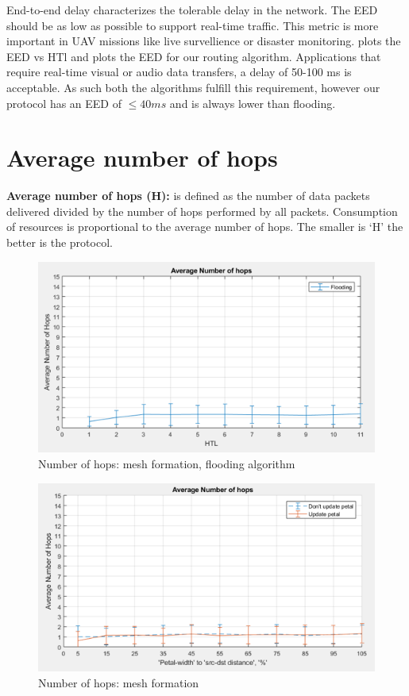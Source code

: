 End-to-end delay characterizes the tolerable delay in the network. The EED should be as low as possible to support real-time traffic. This metric is more important in UAV missions like live survellience or disaster monitoring.  plots the EED vs HTl and  plots the EED for our routing algorithm. Applications that require real-time visual or audio data transfers, a delay of 50-100 ms is acceptable. As such both the algorithms fulfill this requirement, however our protocol has an EED of $\le 40 ms$ and is always lower than flooding.

\section{Average number of hops}
    \textbf{Average number of hops (H):} is defined as the number of data packets delivered divided by the number of hops performed by all packets. Consumption of resources is proportional to the average number of hops. The smaller is `H' the better is the protocol.

\begin{figure}[hbtp]
\centering
\includegraphics[width=1\textwidth]{ncsuthesis-0.6/Chapter-5/figs/fl_hops_mesh.png}
\caption{Number of hops: mesh formation, flooding algorithm}
\label{fig:fl_hops_mesh}
\end{figure}

\begin{figure}[hbtp]
\centering
\includegraphics[width=1\textwidth]{ncsuthesis-0.6/Chapter-5/figs/pe_hops_mesh.png}
\caption{Number of hops: mesh formation}
\label{fig:pe_hops_mesh}
\end{figure}


